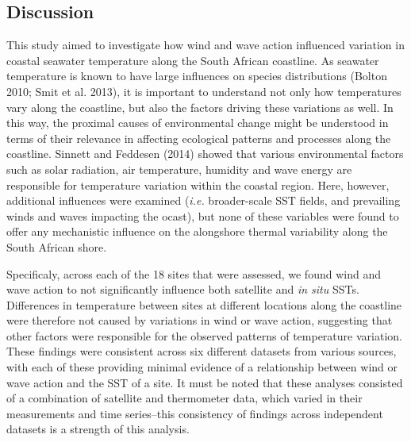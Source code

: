 \documentclass[12pt,a4paper,]{article}
\begin{document}
\hypertarget{discussion}{%
\subsection{Discussion}\label{discussion}}

This study aimed to investigate how wind and wave action influenced
variation in coastal seawater temperature along the South African
coastline. As seawater temperature is known to have large influences on
species distributions (Bolton 2010; Smit et al. 2013), it is important
to understand not only how temperatures vary along the coastline, but
also the factors driving these variations as well. In this way, the
proximal causes of environmental change might be understood in terms of
their relevance in affecting ecological patterns and processes along the
coastline. Sinnett and Feddesen (2014) showed that various environmental
factors such as solar radiation, air temperature, humidity and wave
energy are responsible for temperature variation within the coastal
region. Here, however, additional influences were examined (\emph{i.e.}
broader-scale SST fields, and prevailing winds and waves impacting the
ocast), but none of these variables were found to offer any mechanistic
influence on the alongshore thermal variability along the South African
shore.

Specificaly, across each of the 18 sites that were assessed, we found
wind and wave action to not significantly influence both satellite and
\emph{in situ} SSTs. Differences in temperature between sites at
different locations along the coastline were therefore not caused by
variations in wind or wave action, suggesting that other factors were
responsible for the observed patterns of temperature variation. These
findings were consistent across six different datasets from various
sources, with each of these providing minimal evidence of a relationship
between wind or wave action and the SST of a site. It must be noted that
these analyses consisted of a combination of satellite and thermometer
data, which varied in their measurements and time series--this
consistency of findings across independent datasets is a strength of
this analysis.
\end{document}
